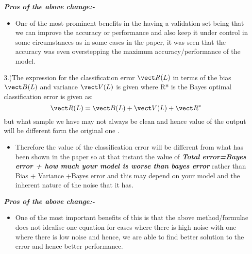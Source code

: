 \documentclass{bmvc2k}
\begin{document}
\textbf{\textit{Pros of the above change:-}}

\begin{itemize}
\item One of the most prominent benefits in the having a validation set being that we can improve the accuracy or performance and also keep it under control in some circumstances as in some cases in the paper, it was seen that the accuracy was even overstepping the maximum accuracy/performance of the model.

\end{itemize}
3.)The expression for the classification error $\vect R(L)$ in terms of the bias $\vect B(L)$ and variance $\vect V(L)$ is given where R* is the Bayes optimal classification error is given as:
\begin{equation}
\vect R(L) = \vect B(L)+\vect V(L)+\vect R^*   
\end{equation}
but what sample we have may not always be clean and hence value of the output will be different form the original one .

\begin{itemize}
\item Therefore the value of the classification error will be different from what has been shown in the paper so at that instant the value of
\textbf{\textit{Total error=Bayes error + how much your model is worse than bayes error}}  rather than Bias + Variance +Bayes error and this may depend on your model and the inherent nature of the   noise that it has.
\end{itemize}



\textbf{\textit{Pros of the above change:-}}

\begin{itemize}
\item One of the most important benefits of this is that the above method/formulae does not idealise one equation for cases where there is high noise with one where there is low noise and hence, we are able to find better solution to the error and hence better performance.
\end{itemize}


\begin{itemize}
\end{itemize}
\end{document}
